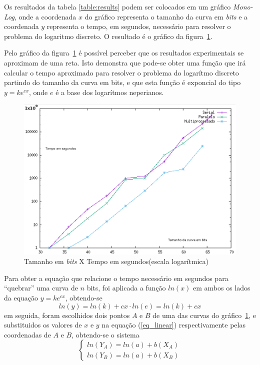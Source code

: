Os resultados da tabela \ref{table:results} podem ser colocados em um gráfico \textit{Mono-Log}, onde a coordenada $x$ do gráfico representa o tamanho da curva em \textit{bits} e a coordenada $y$ representa o tempo, em segundos, necessário para resolver o problema do logaritmo discreto. O resultado é o gráfico da figura~\ref{grafico1}.

Pelo gráfico da figura~\ref{grafico1} é possível perceber que os resultados experimentais se aproximam de uma reta. Isto demonstra que pode-se obter uma função que irá calcular o tempo aproximado para resolver o problema do logarítmo discreto partindo do tamanho da curva em bits, e que esta função é exponcial do tipo \(y = ke^{cx}\), onde $e$ é a base dos logarítmos neperianos.

\begin{figure}
\centering
\includegraphics[scale=0.6, bb=0 0 515 478]{figuras/grafico1.eps}
\caption{Tamanho em \textit{bits} X Tempo em segundos(escala logarítmica)}
\label{grafico1}
\end{figure}

Para obter a equação que relacione o tempo necessário em segundos para ``quebrar'' uma curva de $n$ bits, foi aplicada a função \(ln(x)\) em ambos os lados da equação \(y = ke^{cx}\), obtendo-se
\begin{equation} \label{eq_linear}
	ln(y) = ln(k) + cx\cdot ln(e) = ln(k) + cx
\end{equation}
em seguida, foram escolhidos dois pontos \(A\) e \(B\) de uma das curvas do gráfico~\ref{grafico1}, e substituidos os valores de \(x\) e \(y\) na equação (\ref{eq_linear}) respectivamente pelas coordenadas de \(A\) e \(B\), obtendo-se o sistema
$$
\left\{ \begin{array}{c}	
ln(Y_A) = ln(a) + b(X_A)\\
ln(Y_B) = ln(a) + b(X_B)
\end{array}
\right.
$$

